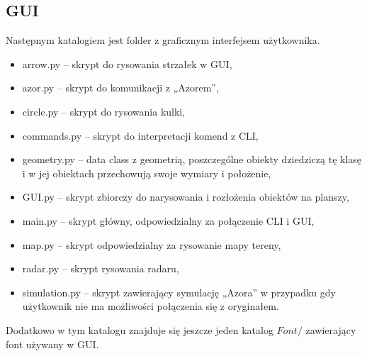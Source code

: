     \subsection{GUI}
        \tab Następnym katalogiem jest folder z graficznym interfejsem użytkownika.
        \begin{itemize}
            \item arrow.py      -- skrypt do rysowania strzałek w GUI,
            \item azor.py       -- skrypt do komunikacji z „Azorem”,
            \item circle.py     -- skrypt do rysowania kulki,
            \item commands.py   -- skrypt do interpretacji komend z CLI,
            \item geometry.py   -- data class z geometrią, poszczególne obiekty dziedziczą tę klasę i w jej obiektach przechowują swoje wymiary i położenie,
            \item GUI.py        -- skrypt zbiorczy do narysowania i rozłożenia obiektów na planszy,
            \item main.py       -- skrypt główny, odpowiedzialny za połączenie CLI i GUI,
            \item map.py        -- skrypt odpowiedzialny za rysowanie mapy tereny,
            \item radar.py      -- skrypt rysowania radaru,
            \item simulation.py -- skrypt zawierający symulację „Azora” w przypadku gdy użytkownik nie ma możliwości połączenia się z oryginałem.
        \end{itemize}
% 
        Dodatkowo w tym katalogu znajduje się jeszcze jeden katalog $Font/$ zawierający font używany w GUI.


